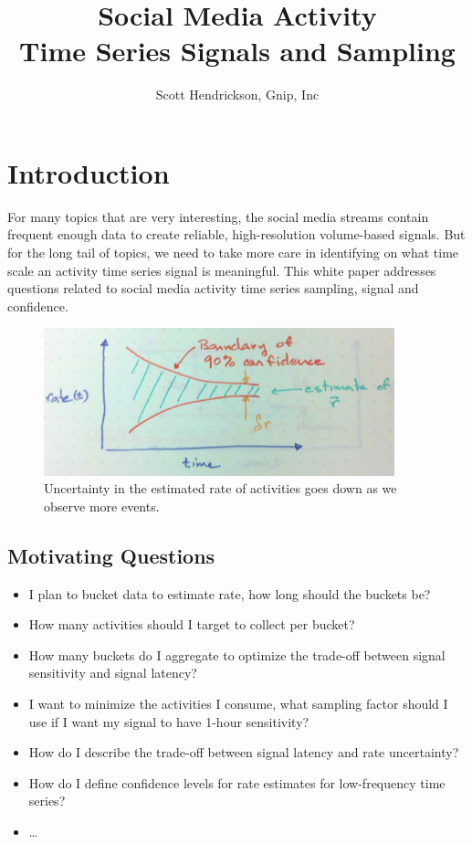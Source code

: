 \documentclass{article}
\begin{document}
\title{Social Media Activity \\ Time Series Signals and Sampling}
\author{Scott Hendrickson, Gnip, Inc}

\maketitle

\section{Introduction}

For many topics that are very interesting, the social media streams contain frequent enough data to create reliable, high-resolution volume-based signals.  But for the long tail of topics, we need to take more care in identifying on what time scale an activity time series signal is meaningful. This white paper addresses questions related to social media activity time series sampling, signal and confidence.

\begin{figure}
    \centering
    \includegraphics[width=4.0in]{./imgs/confidence.jpg}
    \caption{Uncertainty in the estimated rate of activities goes down as we observe more events. }
    \label{fig:confidence}
\end{figure}

\subsection{Motivating Questions}

\begin{itemize}
\item I plan to bucket data to estimate rate, how long should the buckets be? 
\item How many activities should I target to collect per bucket?
\item How many buckets do I aggregate to optimize the trade-off between signal sensitivity and signal latency?
\item I want to minimize the activities I consume, what sampling factor should I use if I want my signal to have 1-hour sensitivity?
\item How do I describe the trade-off between signal latency and rate uncertainty?
\item How do I define confidence levels for rate estimates for low-frequency time series?
\item \ldots
\end{itemize}
\end{document}
